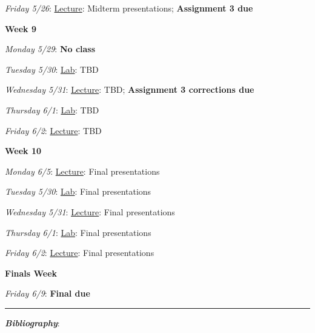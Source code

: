 \documentclass[12pt]{article}
\begin{document}
\emph{Friday 5/26}: \underline{Lecture}: Midterm presentations; \textbf{Assignment 3 due}

\noindent\textbf{Week 9}

\emph{Monday 5/29}: \textbf{No class}

\emph{Tuesday 5/30}: \underline{Lab}: TBD

\emph{Wednesday 5/31}: \underline{Lecture}: TBD;  \textbf{Assignment 3 corrections due}

\emph{Thursday 6/1}: \underline{Lab}: TBD

\emph{Friday 6/2}: \underline{Lecture}: TBD

\noindent\textbf{Week 10}

\emph{Monday 6/5}: \underline{Lecture}: Final presentations

\emph{Tuesday 5/30}: \underline{Lab}: Final presentations

\emph{Wednesday 5/31}: \underline{Lecture}: Final presentations

\emph{Thursday 6/1}: \underline{Lab}: Final presentations

\emph{Friday 6/2}: \underline{Lecture}: Final presentations

\noindent\textbf{Finals Week}

\emph{Friday 6/9}: \textbf{Final due}

\begin{center}
  \rule{\textwidth}{0.5pt}
\end{center}
\nocite{*}

\noindent\textbf{\emph{Bibliography}}:\\
\end{document}
